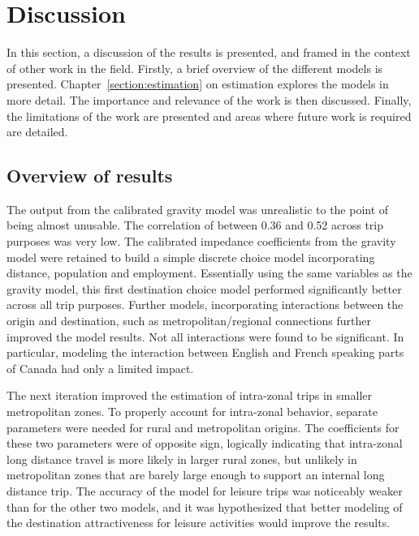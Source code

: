 \chapter{Discussion}
In this section, a discussion of the results is presented, and framed in the context of other work in the field. Firstly, a brief overview of the different models is presented. Chapter~\ref{section:estimation} on estimation explores the models in more detail. The importance and relevance of the work is then discussed. Finally, the limitations of the work are presented and areas where future work is required are detailed.

\section{Overview of results}
The output from the calibrated gravity model  was unrealistic to the point of being almost unusable. The correlation of between 0.36 and 0.52 across trip purposes was very low. The calibrated impedance coefficients from the gravity model were retained to build a simple discrete choice model incorporating distance, population and employment. Essentially using the same variables as the gravity model, this first destination choice model performed significantly better across all trip purposes. Further models, incorporating interactions between the origin and destination, such as metropolitan/regional connections further improved the model results. Not all interactions were found to be significant. In particular, modeling the interaction between English and French speaking parts of Canada had only a limited impact. 

The next iteration improved the estimation of intra-zonal trips in smaller metropolitan zones. To properly account for intra-zonal behavior, separate parameters were needed for rural and metropolitan origins. The coefficients for these two parameters were of opposite sign, logically indicating that intra-zonal long distance travel is more likely in larger rural zones, but unlikely in metropolitan zones that are barely large enough to support an internal long distance trip. The accuracy of the model for leisure trips was noticeably weaker than for the other two models, and it was hypothesized that better modeling of the destination attractiveness for leisure activities would improve the results.


